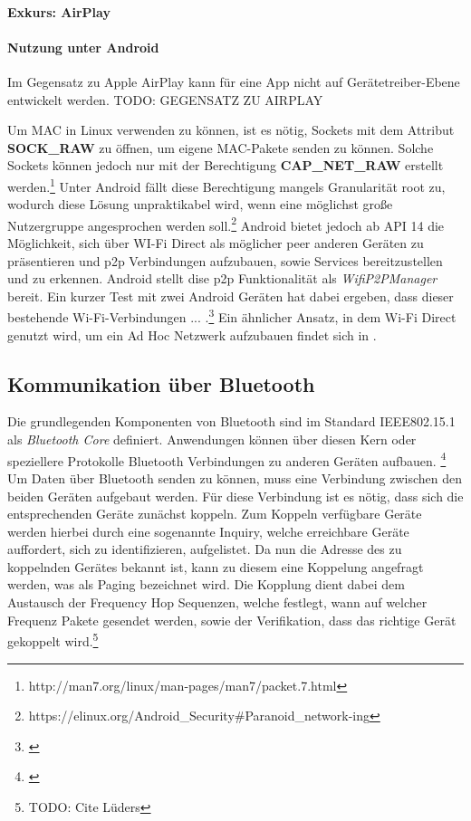 \documentclass[12pt,a4paper]{article}
\begin{document}
            \paragraph{Exkurs: AirPlay}

        
            \paragraph{Nutzung unter Android}
            Im Gegensatz zu Apple AirPlay kann für eine App nicht auf Gerätetreiber-Ebene entwickelt werden. TODO: GEGENSATZ ZU AIRPLAY

            Um MAC in Linux verwenden zu können, ist es nötig, Sockets mit dem Attribut {\bf SOCK\_RAW} zu öffnen,
            um eigene MAC-Pakete senden zu können. Solche Sockets können jedoch nur mit der Berechtigung {\bf CAP\_NET\_RAW} erstellt werden.\footnote{http://man7.org/linux/man-pages/man7/packet.7.html}
            Unter Android fällt diese Berechtigung mangels Granularität root zu, wodurch diese Lösung unpraktikabel wird,
            wenn eine möglichst große Nutzergruppe angesprochen werden soll.\footnote{https://elinux.org/Android\_Security\#Paranoid\_network-ing}
            Android bietet jedoch ab API 14 die Möglichkeit, sich über WI-Fi Direct als möglicher peer anderen Geräten zu präsentieren und
            p2p Verbindungen aufzubauen, sowie Services bereitzustellen und zu erkennen.
            Android stellt dise p2p Funktionalität als {\it WifiP2PManager} bereit. Ein kurzer Test mit zwei Android Geräten hat dabei ergeben,
            dass dieser bestehende Wi-Fi-Verbindungen ... .\footnote{\cite{test-repository}}
            Ein ähnlicher Ansatz, in dem Wi-Fi Direct genutzt wird, um ein Ad Hoc Netzwerk aufzubauen findet sich in \cite{Aneja}.

        \subsection{Kommunikation über Bluetooth}
            Die grundlegenden Komponenten von Bluetooth sind im Standard IEEE802.15.1 als {\it Bluetooth Core} definiert. Anwendungen können über diesen Kern oder speziellere Protokolle Bluetooth
            Verbindungen zu anderen Geräten aufbauen. \footnote{\cite[S.228]{Lueders}} 
            Um Daten über Bluetooth senden zu können, muss eine Verbindung zwischen den beiden Geräten aufgebaut werden. Für diese Verbindung ist es nötig,
            dass sich die entsprechenden Geräte zunächst koppeln. Zum Koppeln verfügbare Geräte werden hierbei durch eine sogenannte Inquiry, welche erreichbare Geräte auffordert,
            sich zu identifizieren, aufgelistet. Da nun die Adresse des zu koppelnden Gerätes bekannt ist, kann zu diesem eine Koppelung angefragt werden, was als Paging bezeichnet wird.
            Die Kopplung dient dabei dem Austausch der Frequency Hop Sequenzen, welche festlegt, wann auf welcher Frequenz Pakete gesendet werden, sowie der Verifikation,
            dass das richtige Gerät gekoppelt wird.\footnote{TODO: Cite Lüders}
\end{document}

